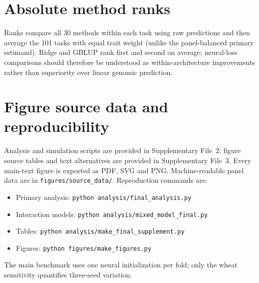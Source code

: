 \documentclass[10pt]{article}
\begin{document}


\section{Absolute method ranks}
Ranks compare all 30 methods within each task using raw predictions and then
average the 101 tasks with equal trait weight (unlike the panel-balanced primary
estimand). Ridge and
GBLUP rank first and second on average; neural-loss comparisons should therefore
be understood as within-architecture improvements rather than superiority over
linear genomic prediction.

\begingroup\small

\endgroup

\section{Figure source data and reproducibility}
Analysis and simulation scripts are provided in Supplementary File~2; figure
source tables and text alternatives are provided in Supplementary File~3.
Every main-text figure is exported as PDF, SVG and PNG. Machine-readable panel data are in
\texttt{figures/source\_data/}. Reproduction commands are:
\begin{itemize}
\item Primary analysis: \texttt{python analysis/final\_analysis.py}
\item Interaction models: \texttt{python analysis/mixed\_model\_final.py}
\item Tables: \texttt{python analysis/make\_final\_supplement.py}
\item Figures: \texttt{python figures/make\_figures.py}
\end{itemize}
The main benchmark uses one neural
initialization per fold; only the wheat sensitivity quantifies three-seed
variation.



\end{document}
